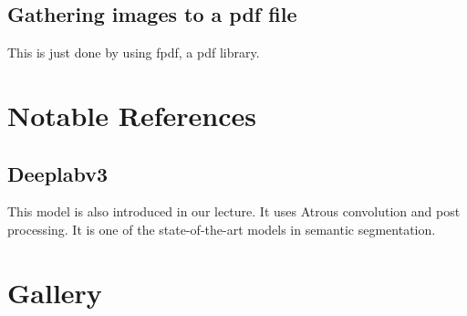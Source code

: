 \documentclass[a4paper]{article}
\begin{document}
\subsection{Gathering images to a pdf file}
This is just done by using fpdf, a pdf library.


\section{Notable References}
\subsection{Deeplabv3\cite{c2}}
This model is also introduced in our lecture. It uses Atrous convolution and post processing. It is one of the state-of-the-art models in semantic segmentation.


\section{Gallery}
\begin{figure}[H]
\centering
{}
\end{figure}
\end{document}

